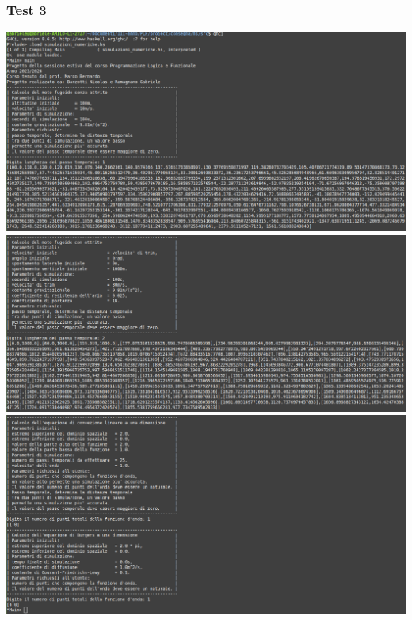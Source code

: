 \subsubsection*{Test 3}
\includegraphics[width=\textwidth,height=\textheight,keepaspectratio]{05_testing/image/hs/03_test/01_uno.png}
\\
\includegraphics[width=\textwidth,height=\textheight,keepaspectratio]{05_testing/image/hs/03_test/02_uno.png}
\\
\includegraphics[width=\textwidth,height=\textheight,keepaspectratio]{05_testing/image/hs/03_test/03_uno.png}


